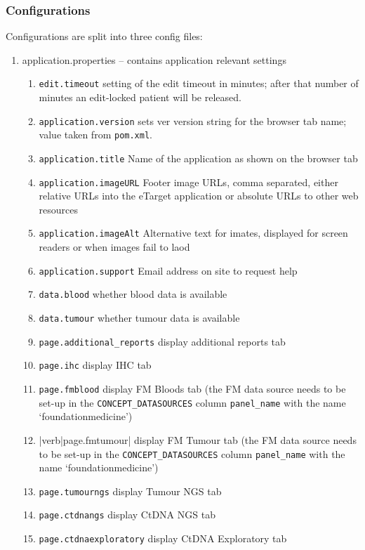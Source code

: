 \subsubsection{Configurations}

Configurations are split into three config files:
\begin{enumerate}
  \item application.properties -- contains application relevant settings
  	\begin{enumerate}
  	  \item \verb|edit.timeout| setting of the edit timeout in minutes; after that number of minutes an edit-locked patient will be released. 
  	  \item \verb|application.version| sets ver version string for the browser tab name; value taken from \verb|pom.xml|.
  	  \item \verb|application.title| Name of the application as shown on the browser tab
  	  \item \verb|application.imageURL| Footer image URLs, comma separated, either relative URLs into the eTarget application or absolute URLs to other web resources
  	  \item \verb|application.imageAlt| Alternative text for imates, displayed for screen readers or when images fail to laod
  	  \item \verb|application.support| Email address on site to request help
  	  \item \verb|data.blood| whether blood data is available
  	  \item \verb|data.tumour| whether tumour data is available
  	  \item \verb|page.additional_reports| display additional reports tab
  	  \item \verb|page.ihc| display IHC tab
  	  \item \verb|page.fmblood| display FM Bloods tab (the FM data source needs to be set-up in the \verb|CONCEPT_DATASOURCES| column \verb|panel_name| with the name `foundationmedicine')
  	  \item |verb|page.fmtumour| display FM Tumour tab (the FM data source needs to be set-up in the \verb|CONCEPT_DATASOURCES| column \verb|panel_name| with the name `foundationmedicine')
  	  \item \verb|page.tumourngs| display Tumour NGS tab
  	  \item \verb|page.ctdnangs| display CtDNA NGS tab
  	  \item \verb|page.ctdnaexploratory| display CtDNA Exploratory tab

\end{enumerate}
\end{enumerate}
